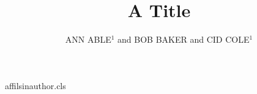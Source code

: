 \begin{filecontents*}[overwrite]{affilsinauthor.cls}
\def\affilfont{\small}
\def\author#1{\gdef\@author{#1}}
\def\affil#1{\gdef\@affil{#1}\ifx\@affil\@empty\else{\reset@font\affilfont\unskip,\ #1\vphantom{gy}\endgraf}\fi}\affil{}
\def\maketitle{\par{\Large\@title\par}{\noindent\@author\par}}
\end{filecontents*}
\documentclass{affilsinauthor}

\title{A Title}
\author{ANN ABLE$^1$ and BOB BAKER and CID COLE$^1$  }
\maketitle
Body.

